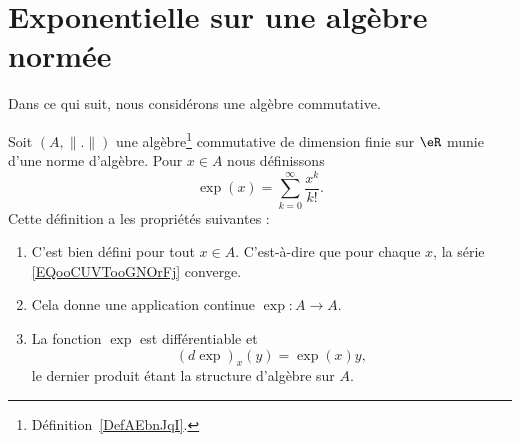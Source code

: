 
\section{Exponentielle sur une algèbre normée}

Dans ce qui suit, nous considérons une algèbre commutative.
\begin{propositionDef}       \label{DEFooSFDUooMNsgZY}
    Soit \( (A,\| . \|)\) une algèbre\footnote{Définition~\ref{DefAEbnJqI}.} commutative de dimension finie sur \( \eR\) munie d'une norme d'algèbre. Pour \( x\in A\) nous définissons
    \begin{equation}        \label{EQooCUVTooGNOrFj}
        \exp(x)=\sum_{k=0}^{\infty}\frac{ x^k }{ k! }.
    \end{equation}
    Cette définition a les propriétés suivantes :
    \begin{enumerate}
        \item
            C'est bien défini pour tout \( x\in A\). C'est-à-dire que pour chaque \( x\), la série \eqref{EQooCUVTooGNOrFj} converge.
        \item
            Cela donne une application continue \( \exp\colon A\to A\).
        \item       \label{ITEMooGGVAooVfhGuu}
            La fonction \( \exp\) est différentiable et
            \begin{equation}        \label{EQooKWBUooLUdBAw}
                (d\exp)_x(y)=\exp(x)y,
            \end{equation}
            le dernier produit étant la structure d'algèbre sur \( A\).
    \end{enumerate}
\end{propositionDef}

